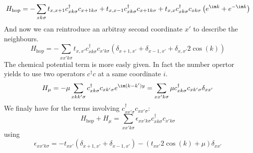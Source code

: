 \documentclass[../main.tex]{subfile}
\begin{document}
\begin{equation*}
    H_{\text{hop}} = -\sum_{x k \sigma} t_{x,x+1} c_{x k\sigma}^{\dagger} c_{x+1 k\sigma} + t_{x,x-1} c_{x k\sigma}^{\dagger} c_{x+1 k\sigma} +  t_{x,x} c_{x k\sigma}^{\dagger} c_{xk\sigma}\left(e^{\im k} + e^{-\im k}\right)
\end{equation*}
And now we can reintroduce an arbitray second coordinate $x'$ to describe the neighbours.
\begin{equation}
    H_{\text{hop}} = -\sum_{xx' k \sigma} t_{x,x'} c_{x k\sigma}^{\dagger} c_{x' k\sigma} \left(\delta_{x+1,x'} + \delta_{x-1,x'} + \delta_{x,x'} 2 \cos(k)\right)
\end{equation}
The chemical potential term is more easly given. In fact the number opertor yields to use two operators $c^{\dagger}c$ at a same coordinate $i$.
\begin{equation}
    H_{\mu} = -\mu \sum_{x kk' \sigma} c_{x k\sigma}^{\dagger} c_{x k'\sigma} e^{\im (k-k')y} = \sum_{xx'k\sigma} \mu c_{xk\sigma}^{\dagger} c_{xk'\sigma} \delta_{xx'}     
\end{equation}
We finaly have for the terms involving $c^{\dagger}_{xx'\sigma} c_{xx'\sigma}$:
\begin{equation*}
    H_{\text{hop}} + H_{\mu} = \sum_{xx'k\sigma} \epsilon_{xx'k\sigma} c_{xk\sigma}^{\dagger} c_{x'k\sigma}
\end{equation*}
using
\[
    \epsilon_{xx'k\sigma}= - t_{xx'} \left(\delta_{x+1, x'} + \delta_{x-1,x'}\right) - \left(t_{xx'}2\cos(k) + \mu\right) \delta_{xx'}
\]
\end{document}
